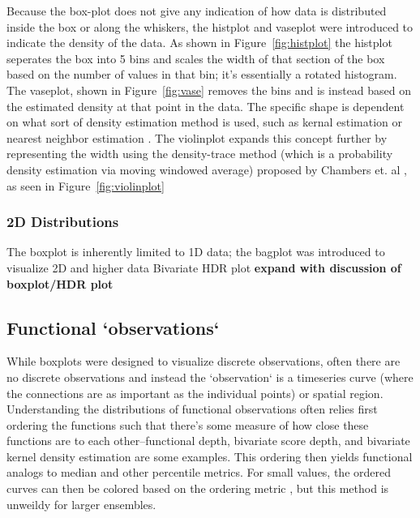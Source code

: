 \documentclass[../main.tex]{subfiles}
\begin{document}
\begin{figure}
\label{fig:histplot}
\label{fig:vase}
\label{fig:violin}
\end{figure}

Because the box-plot does not give any indication of how data is distributed
inside the box or along the whiskers, the histplot and vaseplot were introduced to indicate
the density of the data\cite{benjamini1988}. As shown in
Figure~\ref{fig:histplot} the histplot seperates the box
into  5 bins and scales the width of that section of the box based on the
number of values in that bin; it's essentially a rotated histogram. The
vaseplot, shown in Figure~\ref{fig:vase} removes the bins and is instead based
on the estimated density at that point in the data. The specific shape is
dependent on what sort of density estimation method is used, such as kernal
estimation or nearest neighbor estimation \cite{chambers1983}. The
violinplot \cite{hintz1998} expands this concept further by representing the
width using the density-trace method (which is a probability density estimation
via moving windowed average) proposed by Chambers et. al \cite{chambers1983},
as seen in Figure~\ref{fig:violinplot}


\subsubsection{2D Distributions}
\begin{figure}
\end{figure}
The boxplot is inherently limited to 1D data; the bagplot was introduced to
visualize 2D and higher data \cite{rousseeuw1999}
Bivariate HDR plot \cite{hyndman1996} \textbf{expand with discussion of boxplot/HDR plot}

\subsection{Functional `observations`}

While boxplots were designed to visualize discrete observations, often there
are no discrete observations and instead the `observation` is a timeseries
curve (where the connections are as important as the individual points) or
spatial region. Understanding the distributions of functional observations
often relies first ordering the functions such that there's some measure of how
close these functions are to each other--functional depth\cite{febrero2007},
bivariate score depth\cite{hyndman2009}, and
bivariate kernel density estimation\cite{scott1992} are some examples. This
ordering then yields functional analogs to median and other percentile
metrics. For small values, the ordered curves can then be colored based on the
ordering metric \cite{hyndman2009}, but this method is unweildy for larger
ensembles.
\end{document}

